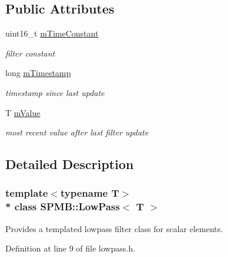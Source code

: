 \subsection*{Public Attributes}
\begin{DoxyCompactItemize}
\item 
uint16\+\_\+t \hyperlink{classSPMB_1_1LowPass_a3272be66039cc317ae295f7e4ce90c23}{m\+Time\+Constant}\hypertarget{classSPMB_1_1LowPass_a3272be66039cc317ae295f7e4ce90c23}{}\label{classSPMB_1_1LowPass_a3272be66039cc317ae295f7e4ce90c23}

\begin{DoxyCompactList}\small\item\em filter constant \end{DoxyCompactList}\item 
long \hyperlink{classSPMB_1_1LowPass_a0d65cef27970b458eb9a8065e3141eae}{m\+Timestamp}\hypertarget{classSPMB_1_1LowPass_a0d65cef27970b458eb9a8065e3141eae}{}\label{classSPMB_1_1LowPass_a0d65cef27970b458eb9a8065e3141eae}

\begin{DoxyCompactList}\small\item\em timestamp since last update \end{DoxyCompactList}\item 
T \hyperlink{classSPMB_1_1LowPass_a63f1e9ef7ccb4a1b51ebb81681d377ec}{m\+Value}\hypertarget{classSPMB_1_1LowPass_a63f1e9ef7ccb4a1b51ebb81681d377ec}{}\label{classSPMB_1_1LowPass_a63f1e9ef7ccb4a1b51ebb81681d377ec}

\begin{DoxyCompactList}\small\item\em most recent value after last filter update \end{DoxyCompactList}\end{DoxyCompactItemize}


\subsection{Detailed Description}
\subsubsection*{template$<$typename T$>$\\*
class S\+P\+M\+B\+::\+Low\+Pass$<$ T $>$}

Provides a templated lowpass filter class for scalar elements. 

Definition at line 9 of file lowpass.\+h.

